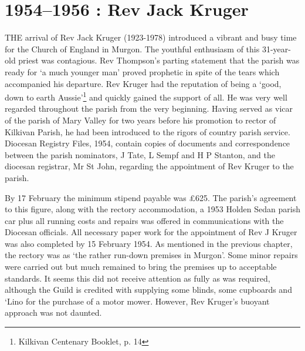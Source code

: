 \balance


\printendnotes[custom]
\setcounter{endnote}{0}
\chapter{1954--1956 : Rev Jack Kruger}
\nobalance


\lettrine[lines=3]{T}{HE}
 arrival of Rev Jack Kruger (1923-1978) introduced a vibrant and busy time for the Church of England in Murgon. The youthful enthusiasm of this 31-year-old priest was contagious. Rev Thompson's parting statement that the parish was ready for `a much younger man' proved prophetic in spite of the tears which accompanied his departure. Rev Kruger had the reputation of being a `good, down to earth Aussie'\footnote{Kilkivan Centenary Booklet, p. 14} and quickly gained the support of all. He was very well regarded throughout the parish from the very beginning. Having served as vicar of the parish of Mary Valley for two years before his promotion to rector of Kilkivan Parish, he had been introduced to the rigors of country parish service. Diocesan Registry Files, 1954, contain copies of documents and correspondence between the parish nominators, J Tate, L Sempf and H P Stanton, and the diocesan registrar, Mr St John, regarding the appointment of Rev Kruger to the parish.

By 17 February the minimum stipend payable was \pounds625. The parish's agreement to this figure, along with the rectory accommodation, a 1953 Holden Sedan parish car plus all running costs and repairs was offered in communications with the Diocesan officials. All necessary paper work for the appointment of Rev J Kruger was also completed by 15 February 1954. As mentioned in the previous chapter, the rectory was as `the rather run-down premises in Murgon'. Some minor repairs were carried out but much remained to bring the premises up to acceptable standards. It seems this did not receive attention as fully as was required, although the Guild is credited with supplying some blinds, some cupboards and `Lino for the purchase of a motor mower. However, Rev Kruger's buoyant approach was not daunted.









